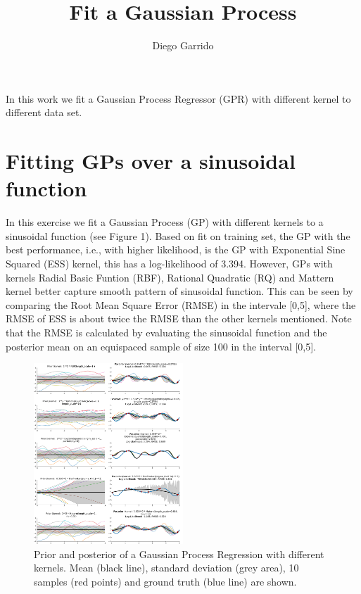 \documentclass{article}
\title{Fit a Gaussian Process}
\author{Diego Garrido}
\begin{document}
\maketitle
In this work we fit a Gaussian Process Regressor (GPR) with different kernel to different data set. \href{https://nbviewer.jupyter.org/github/dgarridoa/fit_gaussian_process/blob/main/Fit_Gaussian_Process.ipynb}{\color{blue}{Jupyter Notebook}}

\section{Fitting GPs over a sinusoidal function}

In this exercise we fit a Gaussian Process (GP) with different kernels to a sinusoidal function (see Figure 1). Based on fit on training set, the GP with the best performance, i.e., with higher likelihood, is the GP with Exponential Sine Squared (ESS) kernel, this has a log-likelihood of 3.394. However, GPs with kernels Radial Basic Funtion (RBF), Rational Quadratic (RQ) and Mattern kernel better capture smooth pattern of sinusoidal function. This can be seen by comparing the Root Mean Square Error (RMSE) in the intervale [0,5], where the RMSE of ESS is about twice the RMSE than the other kernels mentioned. Note that the RMSE is calculated by evaluating the sinusoidal function and the posterior mean on an equispaced sample of size 100 in the interval [0,5].\\
\begin{center}
\begin{figure}[!h]
    \includegraphics[width=0.5\textwidth]{img/gp1.pdf} 
    \caption{Prior and posterior of a Gaussian Process Regression with different kernels. Mean (black line), standard deviation (grey area), 10 samples (red points) and ground truth (blue line) are shown.}
\end{figure}
\end{center}
\end{document}
